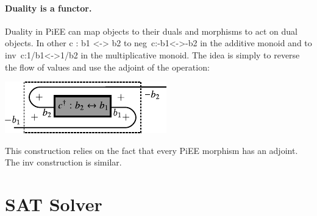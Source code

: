 \documentclass[preprint]{sigplanconf}
\newcommand{\xcomment}[2]{\textbf{#1:~\textsl{#2}}}
\newcommand{\amr}[1]{\xcomment{Amr}{#1}}
\begin{document}
\paragraph*{Duality is a functor.}
Duality in {{PiEE}} can map objects to their duals and morphisms
to act on dual objects. In other {{c : b1 <-> b2}} to
{{neg~c:-b1<->-b2}} in the additive monoid and to
{{inv~c:1/b1<->1/b2}} in the multiplicative monoid. 
The idea is simply to reverse the flow of values and use the
adjoint of the operation:
\begin{multicols}{2}
\begin{center}
  \includegraphics{diagrams/neg_lift.pdf}
\end{center}  

\end{multicols}

This construction relies on the fact that every {{PiEE}} morphism
has an adjoint.  The {{inv}} construction is similar.



\section{SAT Solver }
\label{sec:prog}
\label{sec:sat-solver}


\end{document}
